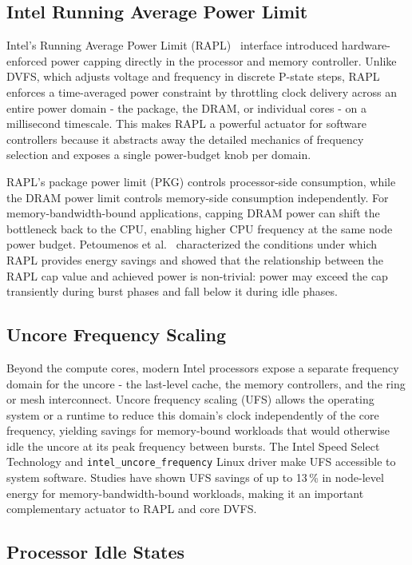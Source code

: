 \subsection{Intel Running Average Power Limit}

Intel's Running Average Power Limit (RAPL)~\cite{david2010rapl} interface
introduced hardware-enforced power capping directly in the processor and memory
controller.  Unlike DVFS, which adjusts voltage and frequency in discrete
P-state steps, RAPL enforces a time-averaged power constraint by throttling
clock delivery across an entire power domain - the package, the DRAM, or
individual cores - on a millisecond timescale.
This makes RAPL a powerful actuator for software controllers because it
abstracts away the detailed mechanics of frequency selection and exposes a
single power-budget knob per domain.

RAPL's package power limit (PKG) controls processor-side consumption, while
the DRAM power limit controls memory-side consumption independently.
For memory-bandwidth-bound applications, capping DRAM power can shift the
bottleneck back to the CPU, enabling higher CPU frequency at the same node
power budget.
Petoumenos et al.~\cite{petoumenos2015power} characterized the conditions under
which RAPL provides energy savings and showed that the relationship between the
RAPL cap value and achieved power is non-trivial: power may exceed the cap
transiently during burst phases and fall below it during idle phases.

\subsection{Uncore Frequency Scaling}

Beyond the compute cores, modern Intel processors expose a separate frequency
domain for the uncore - the last-level cache, the memory controllers, and the
ring or mesh interconnect.  Uncore frequency scaling (UFS) allows the operating
system or a runtime to reduce this domain's clock independently of the core
frequency, yielding savings for memory-bound workloads that would otherwise idle
the uncore at its peak frequency between bursts.
The Intel Speed Select Technology and \texttt{intel\_uncore\_frequency} Linux
driver make UFS accessible to system software.
Studies have shown UFS savings of up to 13\,\% in node-level energy for
memory-bandwidth-bound workloads, making it an important complementary actuator
to RAPL and core DVFS.

\subsection{Processor Idle States}

